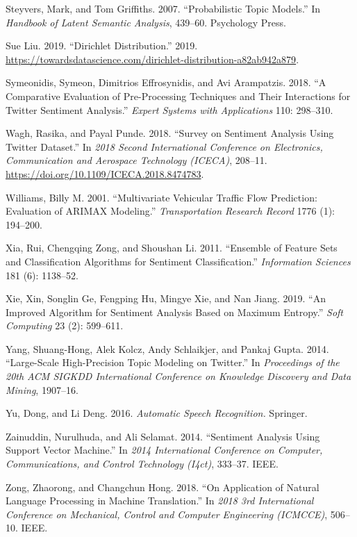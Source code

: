 \documentclass[
]{article}
\newlength{\cslhangindent}
\newlength{\cslentryspacingunit} %
\newenvironment{CSLReferences}[2] %
 {%
  \setlength{\parindent}{0pt}
  \ifodd #1
  \let\oldpar\par
  \def\par{\hangindent=\cslhangindent\oldpar}
  \fi
  \setlength{\parskip}{#2\cslentryspacingunit}
 }%
 {}
\begin{document}
\begin{CSLReferences}{1}{0}
\leavevmode{}%
Steyvers, Mark, and Tom Griffiths. 2007. {``Probabilistic Topic
Models.''} In \emph{Handbook of Latent Semantic Analysis}, 439--60.
Psychology Press.

\leavevmode{}%
Sue Liu. 2019. {``Dirichlet Distribution.''} 2019.
\url{https://towardsdatascience.com/dirichlet-distribution-a82ab942a879}.

\leavevmode{}%
Symeonidis, Symeon, Dimitrios Effrosynidis, and Avi Arampatzis. 2018.
{``A Comparative Evaluation of Pre-Processing Techniques and Their
Interactions for Twitter Sentiment Analysis.''} \emph{Expert Systems
with Applications} 110: 298--310.

\leavevmode{}%
Wagh, Rasika, and Payal Punde. 2018. {``Survey on Sentiment Analysis
Using Twitter Dataset.''} In \emph{2018 Second International Conference
on Electronics, Communication and Aerospace Technology (ICECA)},
208--11. \url{https://doi.org/10.1109/ICECA.2018.8474783}.

\leavevmode{}%
Williams, Billy M. 2001. {``Multivariate Vehicular Traffic Flow
Prediction: Evaluation of ARIMAX Modeling.''} \emph{Transportation
Research Record} 1776 (1): 194--200.

\leavevmode{}%
Xia, Rui, Chengqing Zong, and Shoushan Li. 2011. {``Ensemble of Feature
Sets and Classification Algorithms for Sentiment Classification.''}
\emph{Information Sciences} 181 (6): 1138--52.

\leavevmode{}%
Xie, Xin, Songlin Ge, Fengping Hu, Mingye Xie, and Nan Jiang. 2019.
{``An Improved Algorithm for Sentiment Analysis Based on Maximum
Entropy.''} \emph{Soft Computing} 23 (2): 599--611.

\leavevmode{}%
Yang, Shuang-Hong, Alek Kolcz, Andy Schlaikjer, and Pankaj Gupta. 2014.
{``Large-Scale High-Precision Topic Modeling on Twitter.''} In
\emph{Proceedings of the 20th ACM SIGKDD International Conference on
Knowledge Discovery and Data Mining}, 1907--16.

\leavevmode{}%
Yu, Dong, and Li Deng. 2016. \emph{Automatic Speech Recognition.}
Springer.

\leavevmode{}%
Zainuddin, Nurulhuda, and Ali Selamat. 2014. {``Sentiment Analysis Using
Support Vector Machine.''} In \emph{2014 International Conference on
Computer, Communications, and Control Technology (I4ct)}, 333--37. IEEE.

\leavevmode{}%
Zong, Zhaorong, and Changchun Hong. 2018. {``On Application of Natural
Language Processing in Machine Translation.''} In \emph{2018 3rd
International Conference on Mechanical, Control and Computer Engineering
(ICMCCE)}, 506--10. IEEE.

\end{CSLReferences}
\end{document}
